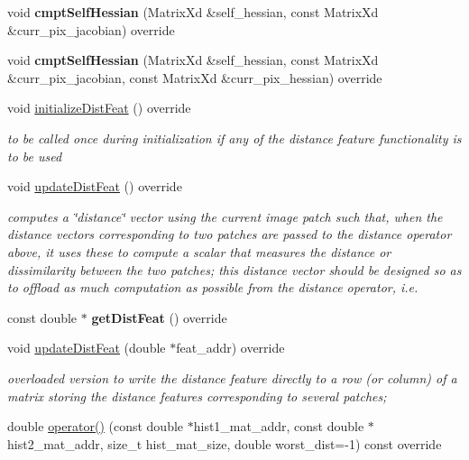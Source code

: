 \begin{DoxyCompactItemize}
\item 
\hypertarget{classMI_a825010932c0fb3f16927224877ece727}{void {\bfseries cmpt\-Self\-Hessian} (Matrix\-Xd \&self\-\_\-hessian, const Matrix\-Xd \&curr\-\_\-pix\-\_\-jacobian) override}\label{classMI_a825010932c0fb3f16927224877ece727}

\item 
\hypertarget{classMI_aecc362c7fcb67765eec3a865cc8a7a34}{void {\bfseries cmpt\-Self\-Hessian} (Matrix\-Xd \&self\-\_\-hessian, const Matrix\-Xd \&curr\-\_\-pix\-\_\-jacobian, const Matrix\-Xd \&curr\-\_\-pix\-\_\-hessian) override}\label{classMI_aecc362c7fcb67765eec3a865cc8a7a34}

\item 
\hypertarget{classMI_a433e1e924f660440072f6f11d653303d}{void \hyperlink{classMI_a433e1e924f660440072f6f11d653303d}{initialize\-Dist\-Feat} () override}\label{classMI_a433e1e924f660440072f6f11d653303d}

\begin{DoxyCompactList}\small\item\em to be called once during initialization if any of the distance feature functionality is to be used \end{DoxyCompactList}\item 
void \hyperlink{classMI_a3a84c8231147a626633e6fa56a55be05}{update\-Dist\-Feat} () override
\begin{DoxyCompactList}\small\item\em computes a \char`\"{}distance\char`\"{} vector using the current image patch such that, when the distance vectors corresponding to two patches are passed to the distance operator above, it uses these to compute a scalar that measures the distance or dissimilarity between the two patches; this distance vector should be designed so as to offload as much computation as possible from the distance operator, i.\-e. \end{DoxyCompactList}\item 
\hypertarget{classMI_afc82235327e8b572ccba85a703875ac8}{const double $\ast$ {\bfseries get\-Dist\-Feat} () override}\label{classMI_afc82235327e8b572ccba85a703875ac8}

\item 
\hypertarget{classMI_a853b418113e21357c476b3ca6ab804d4}{void \hyperlink{classMI_a853b418113e21357c476b3ca6ab804d4}{update\-Dist\-Feat} (double $\ast$feat\-\_\-addr) override}\label{classMI_a853b418113e21357c476b3ca6ab804d4}

\begin{DoxyCompactList}\small\item\em overloaded version to write the distance feature directly to a row (or column) of a matrix storing the distance features corresponding to several patches; \end{DoxyCompactList}\item 
\hypertarget{classMI_a14203b54c1ff42852263c1f9e2758db8}{double \hyperlink{classMI_a14203b54c1ff42852263c1f9e2758db8}{operator()} (const double $\ast$hist1\-\_\-mat\-\_\-addr, const double $\ast$hist2\-\_\-mat\-\_\-addr, size\-\_\-t hist\-\_\-mat\-\_\-size, double worst\-\_\-dist=-\/1) const override}\label{classMI_a14203b54c1ff42852263c1f9e2758db8}


\end{DoxyCompactItemize}
